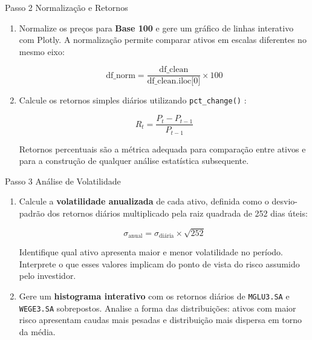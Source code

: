 \documentclass[11pt,a4paper]{article}
\newcommand{\code}[1]{%
  \colorbox{quantlightgray}{\texttt{\small\color{quantdark}#1}}%
}
\begin{document}
\vspace{1em}

\begin{stepbox}{Passo 2 \quad Normalização e Retornos}
\begin{enumerate}
  \item Normalize os preços para \textbf{Base 100} e gere um gráfico de linhas interativo com
        Plotly. A normalização permite comparar ativos em escalas diferentes no mesmo eixo:

        \[
          \text{df\_norm} = \frac{\text{df\_clean}}{\text{df\_clean.iloc[0]}} \times 100
        \]

  \item Calcule os retornos simples diários utilizando \code{pct\_change()}:

        \[
          R_t = \frac{P_t - P_{t-1}}{P_{t-1}}
        \]

        Retornos percentuais são a métrica adequada para comparação entre ativos e para
        a construção de qualquer análise estatística subsequente.
\end{enumerate}
\end{stepbox}

\vspace{1em}

\begin{stepbox}{Passo 3 \quad Análise de Volatilidade}
\begin{enumerate}
  \item Calcule a \textbf{volatilidade anualizada} de cada ativo, definida como o desvio-padrão
        dos retornos diários multiplicado pela raiz quadrada de 252 dias úteis:

        \[
          \sigma_{\text{anual}} = \sigma_{\text{diária}} \times \sqrt{252}
        \]

        Identifique qual ativo apresenta maior e menor volatilidade no período. Interprete
        o que esses valores implicam do ponto de vista do risco assumido pelo investidor.

  \item Gere um \textbf{histograma interativo} com os retornos diários de \code{MGLU3.SA} e
        \code{WEGE3.SA} sobrepostos. Analise a forma das distribuições: ativos com maior risco
        apresentam caudas mais pesadas e distribuição mais dispersa em torno da média.
\end{enumerate}
\end{stepbox}
\end{document}
